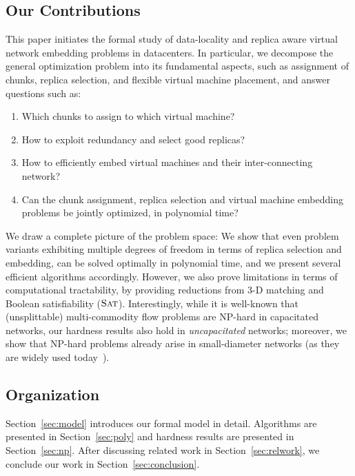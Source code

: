 \documentclass[conference,10pt]{IEEEtran}
\newcommand{\SAT}{\textsc{Sat}}
\begin{document}
\subsection{Our Contributions}

This paper initiates the formal study of data-locality and replica aware virtual network embedding problems in datacenters.
In particular, we decompose the general optimization problem into its fundamental aspects, such as
assignment of chunks, replica selection, and flexible virtual machine
placement, and answer questions such as:
\begin{enumerate}
\item Which chunks to assign to which virtual machine?

\item How to exploit redundancy and select good replicas?

\item How to efficiently embed virtual machines and their inter-connecting network?

\item Can the chunk assignment, replica selection and virtual machine embedding problems be jointly optimized, in polynomial time?
\end{enumerate}

We draw a complete picture of the problem space: We show that
even problem variants exhibiting multiple degrees of freedom in terms of
replica selection and embedding,
can be solved optimally in polynomial time, and we present several efficient
algorithms accordingly. However, we also prove limitations in terms of
computational tractability, by providing reductions from 3-D matching
and Boolean satisfiability ($\SAT$). Interestingly,
while it is well-known that (unsplittable) multi-commodity flow
problems are NP-hard in capacitated networks, our hardness results also hold in \emph{uncapacitated}
networks; moreover, we show that NP-hard problems already arise in small-diameter networks (as they are
widely used today~\cite{fattree}).


\subsection{Organization}

Section~\ref{sec:model} introduces our formal model in detail.
Algorithms are presented in Section~\ref{sec:poly} and
hardness results are presented in Section~\ref{sec:np}.
After discussing related work in Section~\ref{sec:relwork},
we conclude our work in Section~\ref{sec:conclusion}.
\end{document}
